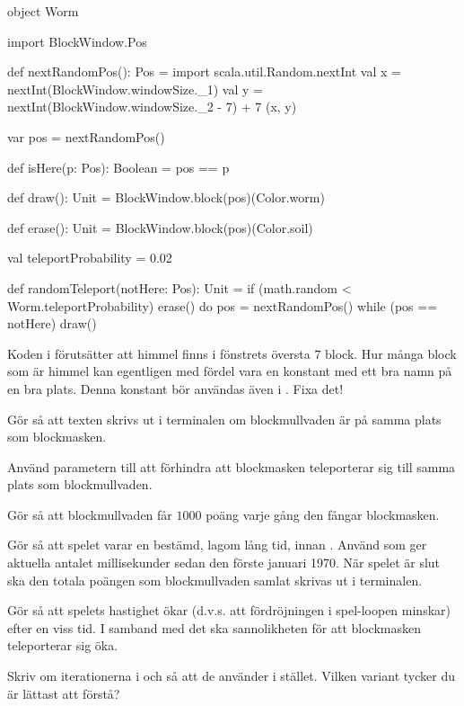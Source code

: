 \begin{Code}
object Worm {
  import BlockWindow.Pos

  def nextRandomPos(): Pos = {
    import scala.util.Random.nextInt
    val x = nextInt(BlockWindow.windowSize._1)
    val y = nextInt(BlockWindow.windowSize._2 - 7) + 7
    (x, y)
  }

  var pos = nextRandomPos()

  def isHere(p: Pos): Boolean = pos == p

  def draw(): Unit  = BlockWindow.block(pos)(Color.worm)

  def erase(): Unit = BlockWindow.block(pos)(Color.soil)

  val teleportProbability = 0.02

  def randomTeleport(notHere: Pos): Unit =
    if (math.random < Worm.teleportProbability) {
      erase()
      do pos = nextRandomPos() while (pos == notHere)
      draw()
    }
}
\end{Code}

\Subtask Koden i  förutsätter att himmel finns i fönstrets översta $7$ block. Hur många block som är himmel kan egentligen med fördel vara en konstant med ett bra namn på en bra plats. Denna konstant bör användas även i . Fixa det!

\Subtask Gör så att texten  skrivs ut i terminalen om blockmullvaden är på samma plats som blockmasken.

\Subtask Använd parametern  till att förhindra att blockmasken teleporterar sig till samma plats som blockmullvaden.

\Subtask Gör så att blockmullvaden får $1000$ poäng varje gång den fångar blockmasken.

\Subtask Gör så att spelet varar en bestämd, lagom lång tid, innan . Använd  som ger aktuella antalet millisekunder sedan den förste januari 1970. När spelet är slut ska den totala poängen som blockmullvaden samlat skrivas ut i terminalen.

\Subtask Gör så att spelets hastighet ökar (d.v.s. att fördröjningen i spel-loopen minskar) efter en viss tid. I samband med det ska sannolikheten för att blockmasken teleporterar sig öka.

\Task
Skriv om iterationerna i  och  så att de använder  i stället. Vilken variant tycker du är lättast att förstå?
